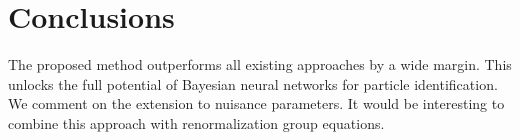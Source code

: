 \section{Conclusions}\label{sec:conclusions}

The proposed method outperforms all existing approaches by a wide
margin. This unlocks the full potential of Bayesian neural networks for
particle identification. We comment on the extension to nuisance
parameters. It would be interesting to combine this approach with
renormalization group equations.

